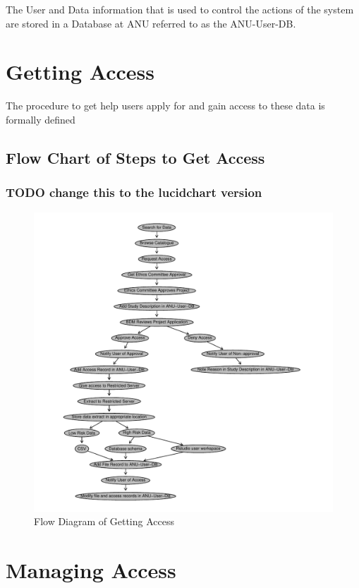 \documentclass[a4paper]{article}
\begin{document}
The User and Data information that is used to control the actions of the system are stored in a Database at ANU referred to as the ANU-User-DB.
\section{Getting Access}
\label{sec-3}

The procedure to get help users apply for and gain access to these data is formally defined 
\newpage
\subsection{Flow Chart of Steps to Get Access}
\label{sec-3-1}
\subsubsection{\textbf{TODO} change this to the lucidchart version}
\label{sec-3-1-1}

\begin{figure}[!h]
\centering
\includegraphics[width=\textwidth]{DataAccessFlowDiagram-GettingAccess.pdf}
\caption{Flow Diagram of Getting Access}
\label{fig:DataAccessFlowDiagram-GettingAccess}
\end{figure}
\clearpage
\section{Managing Access}
\label{sec-4}
\end{document}
